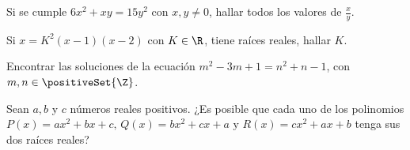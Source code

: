 \begin{multicols}{2}
    \begin{exercise}
        Si se cumple $6x^2 + xy = 15y^2$ con $x, y \neq 0$, hallar todos los valores de $\frac{x}{y}$.
    \end{exercise}

    \begin{exercise}
        Si $x = K^2(x - 1)(x - 2)$ con $K \in \R$, tiene raíces reales, hallar $K$.
    \end{exercise}

    \begin{exercise}
        Encontrar las soluciones de la ecuación $m^2 - 3m + 1 = n^2 + n - 1$, con $m, n \in \positiveSet{\Z}$.
    \end{exercise}

    \begin{problem}
        Sean $a, b$ y $c$ números reales positivos.
        ¿Es posible que cada uno de los polinomios $P(x) = ax^2 + bx + c \mbox{, } Q(x) = bx^2 + cx + a \mbox{ y } R(x) = cx^2 + ax + b$ tenga sus dos raíces reales?
    \end{problem}

\end{multicols}